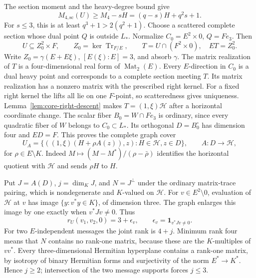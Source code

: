 \documentclass[12pt,letterpaper,onecolumn]{article}
\theoremstyle{definition}
\theoremstyle{remark}
\DeclareMathOperator{\Tr}{Tr}
\begin{document}
The section moment and the heavy-degree bound give
\begin{equation}\label{eq:core-scattered-lower}
M_{4,\mathrm{sc}}(U)\ge M_4-sH=(q-s)H+q^2s+1.
\end{equation}
For \(s\le3\), this is at least \(q^3+1>2(q^2+1)\). Choose a scattered complete section whose dual point \(Q\) is outside \(L_*\).
Normalize \(C_0=E^2\times0\), \(Q=Fe_3\). Then
\[
U\subseteq Z_0^2\times F,\qquad Z_0=\ker\Tr_{F/E},\qquad
T=U\cap(F^2\times0),\quad ET=Z_0^2.
\]
Write \(Z_0=\gamma(E+E\xi)\), \([E(\xi):E]=3\), and absorb \(\gamma\).
The matrix realization of \(T\) is a four-dimensional real form of \(\operatorname{Mat}_2(E)\).
Every \(E\)-direction in \(C_0\) is a dual heavy point and corresponds to a complete section meeting \(T\). Its matrix realization has a nonzero matrix with the prescribed right kernel. For a fixed right kernel the lifts all lie on one \(F\)-point, so scatteredness gives uniqueness.
Lemma~\ref{lem:core-right-descent} makes \(T=(1,\xi)\mathcal H\) after a horizontal coordinate change.
The scalar fiber \(B_0=W\cap Fe_3\) is ordinary, since every quadratic fiber of \(W\) belongs to \(C_0\subset L_*\).
Its orthogonal \(D=B_0^\circ\) has dimension four and \(ED=F\).
This proves the complete graph cover
\begin{equation}\label{eq:core-hermitian-image}
U_A=\{((1,\xi)(H+\rho A(z)),z):H\in\mathcal H,z\in D\},
\qquad A:D\to\mathcal H,
\end{equation}
for \(\rho\in E\setminus K\).
Indeed \(M\mapsto(M-M^*)/(\rho-\bar\rho)\) identifies the horizontal quotient with \(\mathcal H\) and sends \(\rho H\) to \(H\).

Put \(J=A(D)\), \(j=\dim_KJ\), and \(N=J^\perp\) under the ordinary matrix-trace pairing, which is nondegenerate and \(K\)-valued on \(\mathcal H\).
For \(v\in E^2\setminus0\), evaluation of \(\mathcal H\) at \(v\) has image \(\{y:v^*y\in K\}\), of dimension three.
The graph enlarges this image by one exactly when \(v^*Jv\ne0\). Thus
\[
r_U(v_1,v_2,0)=3+\epsilon_v,
\qquad \epsilon_v=\mathbf1_{v^*Jv\ne0}.
\]
For two \(E\)-independent messages the joint rank is \(4+j\).
Minimum rank four means that \(N\) contains no rank-one matrix, because these are the \(K\)-multiples of \(vv^*\).
Every three-dimensional Hermitian hyperplane contains a rank-one matrix, by isotropy of binary Hermitian forms and surjectivity of the norm \(E^*\to K^*\).
Hence \(j\ge2\); intersection of the two message supports forces \(j\le3\).
\end{document}
